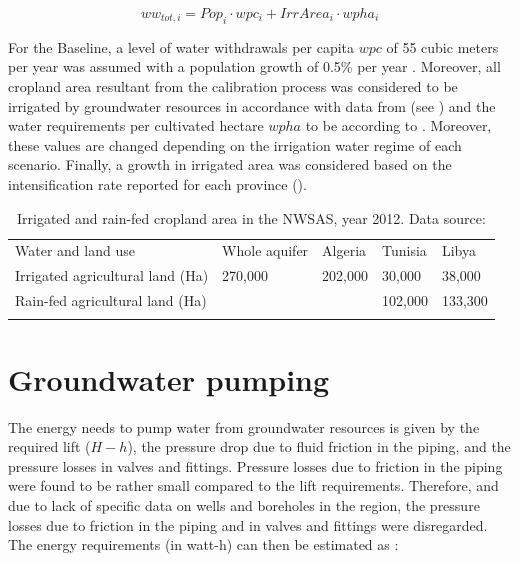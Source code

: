 \documentclass[12pt]{iopart}
\begin{document}
\begin{equation}\label{eq:waterwithdrawals} 
 ww_{tot,i} = Pop_{i}\cdot wpc_{i} +IrrArea_{i}\cdot wpha_{i} 
\end{equation}

For the Baseline, a level of water withdrawals per capita $wpc$ of 55 cubic meters per year was assumed with a population growth of 0.5\% per year \cite{Householdwaterconsumption2014}. Moreover, all cropland area resultant from the calibration process was considered to be irrigated by groundwater resources in accordance with data from \cite{abuzeidNorthWesternSahara2015} (see ) and the water requirements per cultivated hectare $wpha$ to be according to . Moreover, these values are changed depending on the irrigation water regime of each scenario. Finally, a growth in irrigated area was considered based on the intensification rate reported for each province ().

\begin{table}[!h]
	\caption{\label{tbl:watersources}Irrigated and rain-fed cropland area in the NWSAS, year 2012. Data source: \cite{abuzeidNorthWesternSahara2015}}
	\footnotesize
	\begin{tabular}{@{}*{5}{l}}
		\br
		Water and land use & Whole aquifer & Algeria & Tunisia & Libya\\
		\mr
		Irrigated agricultural land (Ha) & 270,000 & 202,000 & 30,000 & 38,000\\
		Rain-fed agricultural land (Ha) &  &  & 102,000 & 133,300\\
		\br
	\end{tabular}
\end{table}

\section{Groundwater pumping}\label{Sc:pumping}
The energy needs to pump water from groundwater resources is given by the required lift ($H-h$), the pressure drop due to fluid friction in the piping, and the pressure losses in valves and fittings. Pressure losses due to friction in the piping were found to be rather small compared to the lift requirements. Therefore, and due to lack of specific data on wells and boreholes in the region, the pressure losses due to friction in the piping and in valves and fittings were disregarded. The energy requirements (in watt-h) can then be estimated as  \cite{Groundwaterdependentirrigationcosts2017}:
\end{document}
